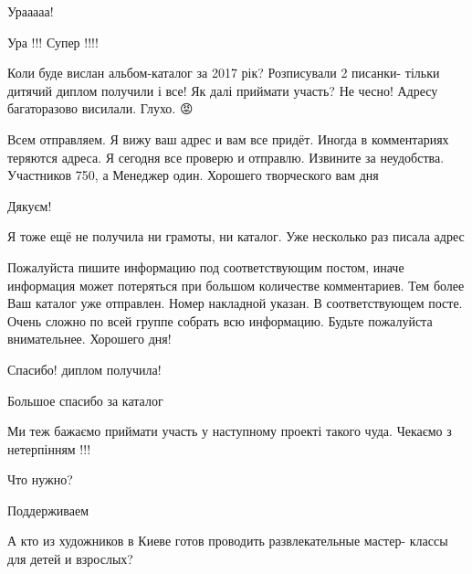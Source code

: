 
Урааааа!


Ура !!! Супер !!!!


Коли буде вислан альбом-каталог за 2017 рік? Розписували 2 писанки- тільки
дитячий диплом получили і все! Як далі приймати участь? Не чесно! Адресу
багаторазово висилали. Глухо. 😡

\begin{itemize} %

Всем отправляем. Я вижу ваш адрес и вам все придёт. Иногда в комментариях
теряются адреса. Я сегодня все проверю и отправлю. Извините за неудобства.
Участников 750, а Менеджер один. Хорошего творческого вам дня 🌸🌸🌸

Дякуєм!
\end{itemize} %


Я тоже ещё не получила ни грамоты, ни каталог. Уже несколько раз писала адрес

\begin{itemize} %

Пожалуйста пишите информацию под соответствующим постом, иначе информация может
потеряться при большом количестве комментариев. Тем более Ваш каталог уже
отправлен. Номер накладной указан. В соответствующем посте. Очень сложно по
всей группе собрать всю информацию. Будьте пожалуйста внимательнее. Хорошего
дня!

\end{itemize} %


Спасибо! диплом получила!


Большое спасибо за каталог


Ми теж бажаємо приймати участь у наступному проекті такого чуда. Чекаємо з
нетерпінням !!!


Что нужно?


Поддерживаем


А кто из художников в Киеве готов проводить развлекательные мастер- классы для
детей и взрослых?

